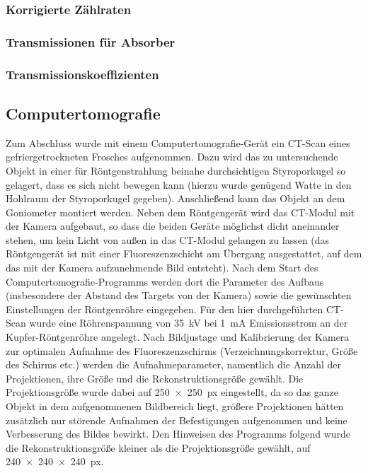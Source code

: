 \documentclass[11pt, a4paper]{article}
\numberwithin{equation}{section}
\begin{document}
\subsubsection{Korrigierte Zählraten}

\subsubsection{Transmissionen für Absorber}

\subsubsection{Transmissionskoeffizienten}

\subsection{Computertomografie}

Zum Abschluss wurde mit einem Computertomografie-Gerät ein CT-Scan eines gefriergetrockneten Frosches aufgenommen.
Dazu wird das zu untersuchende Objekt in einer für Röntgenstrahlung beinahe durchsichtigen Styroporkugel so gelagert, dass es sich nicht bewegen kann (hierzu wurde genügend Watte in den Hohlraum der Styroporkugel gegeben).
Anschließend kann das Objekt an dem Goniometer montiert werden.
Neben dem Röntgengerät wird das CT-Modul mit der Kamera aufgebaut, so dass die beiden Geräte möglichst dicht aneinander stehen, um kein Licht von außen in das CT-Modul gelangen zu lassen (das Röntgengerät ist mit einer Fluoreszenzschicht am Übergang ausgestattet, auf dem das mit der Kamera aufzunehmende Bild entsteht).
Nach dem Start des Computertomografie-Programms werden dort die Parameter des Aufbaus (insbesondere der Abstand des Targets von der Kamera) sowie die gewünschten Einstellungen der Röntgenröhre eingegeben.
Für den hier durchgeführten CT-Scan wurde eine Röhrenspannung von \SI{35}{\kilo\volt} bei \SI{1}{\milli\ampere} Emissionsstrom an der Kupfer-Röntgenröhre angelegt.
Nach Bildjustage und Kalibrierung der Kamera zur optimalen Aufnahme des Fluoreszenzschirms (Verzeichnungskorrektur, Größe des Schirms etc.) werden die Aufnahmeparameter, namentlich die Anzahl der Projektionen, ihre Größe und die Rekonstruktionsgröße gewählt.
Die Projektionsgröße wurde dabei auf \SI{250x250}{px} eingestellt, da so das ganze Objekt in dem aufgenommenen Bildbereich liegt, größere Projektionen hätten zusätzlich nur störende Aufnahmen der Befestigungen aufgenommen und keine Verbesserung des Bildes bewirkt.
Den Hinweisen des Programms folgend wurde die Rekonstruktionsgröße kleiner als die Projektionsgröße gewählt, auf \SI{240x240x240}{px}.
\end{document}
